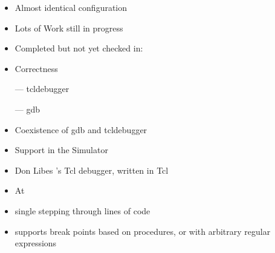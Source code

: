 \documentclass[landscape]{foils}
\begin{document}
\begin{itemize}
\item Almost identical configuration
\item Lots of Work still in progress
\item Completed but not yet checked in:
\end{itemize}

\begin{comment}
\item two new commands, subclass of Simulator
\item API fpr loss dependency
\end{comment}

\begin{itemize}
\item Correctness

--- tcldebugger

--- gdb

\item Coexistence of gdb and tcldebugger

\item Support in the Simulator
\end{itemize}

\begin{comment}
\item debugging tips
\item Discusses space debugging earlier
\item Not run nto time scaling yet
\item correctness analysis
\item hard in dual environment, or is it?
\end{comment}

\begin{itemize}
\item Don Libes 's Tcl debugger, written in Tcl
\item At 
\item single stepping through lines of code 
\item supports break points based on procedures, or with arbitrary
  regular expressions
\end{itemize}
\end{document}
